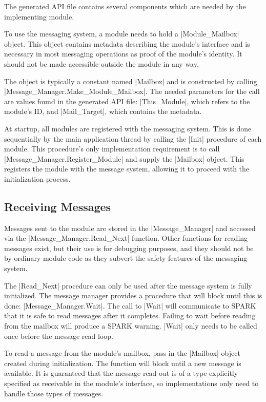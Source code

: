 The generated API file contains several components which are needed by the implementing module.

To use the messaging system, a module needs to hold a |Module_Mailbox| object. This object
contains metadata describing the module's interface and is necessary in most messaging
operations as proof of the module's identity. It should not be made accessible outside the
module in any way.

The object is typically a constant named |Mailbox| and is constructed by calling
|Message_Manager.Make_Module_Mailbox|. The needed parameters for the call are values found in
the generated API file: |This_Module|, which refers to the module's ID, and |Mail_Target|, which
contains the metadata.

At startup, all modules are registered with the messaging system. This is done sequentially by
the main application thread by calling the |Init| procedure of each module. This procedure's
only implementation requirement is to call |Message_Manager.Register_Module| and supply the
|Mailbox| object. This registers the module with the message system, allowing it to proceed with
the initialization process.

\subsection{Receiving Messages}

Messages sent to the module are stored in the |Message_Manager| and accessed via the
|Message_Manager.Read_Next| function. Other functions for reading messages exist, but their use
is for debugging purposes, and they should not be by ordinary module code as they subvert the
safety features of the messaging system.

The |Read_Next| procedure can only be used after the message system is fully initialized. The
message manager provides a procedure that will block until this is done: |Message_Manager.Wait|.
The call to |Wait| will communicate to SPARK that it is safe to read messages after it
completes. Failing to wait before reading from the mailbox will produce a SPARK warning. |Wait|
only needs to be called once before the message read loop.

To read a message from the module's mailbox, pass in the |Mailbox| object created during
initialization. The function will block until a new message is available. It is guaranteed that
the message read out is of a type explicitly specified as receivable in the module's interface,
so implementations only need to handle those types of messages.

